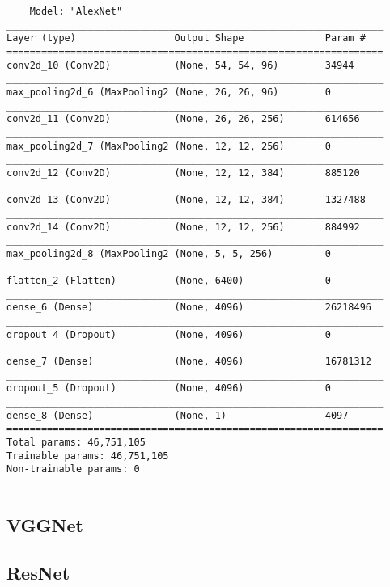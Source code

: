 \begin{verbatim}
    Model: "AlexNet"
_________________________________________________________________
Layer (type)                 Output Shape              Param #   
=================================================================
conv2d_10 (Conv2D)           (None, 54, 54, 96)        34944     
_________________________________________________________________
max_pooling2d_6 (MaxPooling2 (None, 26, 26, 96)        0         
_________________________________________________________________
conv2d_11 (Conv2D)           (None, 26, 26, 256)       614656    
_________________________________________________________________
max_pooling2d_7 (MaxPooling2 (None, 12, 12, 256)       0         
_________________________________________________________________
conv2d_12 (Conv2D)           (None, 12, 12, 384)       885120    
_________________________________________________________________
conv2d_13 (Conv2D)           (None, 12, 12, 384)       1327488   
_________________________________________________________________
conv2d_14 (Conv2D)           (None, 12, 12, 256)       884992    
_________________________________________________________________
max_pooling2d_8 (MaxPooling2 (None, 5, 5, 256)         0         
_________________________________________________________________
flatten_2 (Flatten)          (None, 6400)              0         
_________________________________________________________________
dense_6 (Dense)              (None, 4096)              26218496  
_________________________________________________________________
dropout_4 (Dropout)          (None, 4096)              0         
_________________________________________________________________
dense_7 (Dense)              (None, 4096)              16781312  
_________________________________________________________________
dropout_5 (Dropout)          (None, 4096)              0         
_________________________________________________________________
dense_8 (Dense)              (None, 1)                 4097      
=================================================================
Total params: 46,751,105
Trainable params: 46,751,105
Non-trainable params: 0
_________________________________________________________________
\end{verbatim}

\subsection{VGGNet}

\subsection{ResNet}

